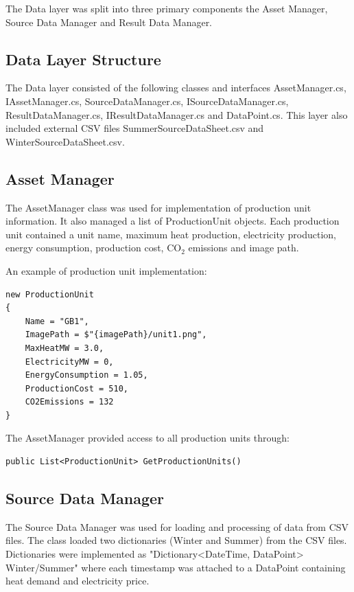 The Data layer was split into three primary components the Asset Manager, Source Data Manager and Result Data Manager.

\subsection{Data Layer Structure}

The Data layer consisted of the following classes and interfaces AssetManager.cs, IAssetManager.cs, SourceDataManager.cs, ISourceDataManager.cs, ResultDataManager.cs, IResultDataManager.cs and DataPoint.cs.
This layer also included external CSV files SummerSourceDataSheet.csv and WinterSourceDataSheet.csv.


\subsection{Asset Manager}

The AssetManager class was used for implementation of production unit information.
It also managed a list of ProductionUnit objects.
Each production unit contained a unit name, maximum heat production, electricity production, energy consumption, production cost, CO$_2$ emissions and image path.

\noindent \newline An example of production unit implementation:

\begin{verbatim}
new ProductionUnit
{
    Name = "GB1",
    ImagePath = $"{imagePath}/unit1.png",
    MaxHeatMW = 3.0,
    ElectricityMW = 0,
    EnergyConsumption = 1.05,
    ProductionCost = 510,
    CO2Emissions = 132
}
\end{verbatim}
The AssetManager provided access to all production units through:

\begin{verbatim}
public List<ProductionUnit> GetProductionUnits()
\end{verbatim}


\subsection{Source Data Manager}

The Source Data Manager was used for loading and processing of data from CSV files.
The class loaded two dictionaries (Winter and Summer) from the CSV files. Dictionaries were implemented as "Dictionary<DateTime, DataPoint> Winter/Summer" where each timestamp was attached to a DataPoint containing heat demand and electricity price.



